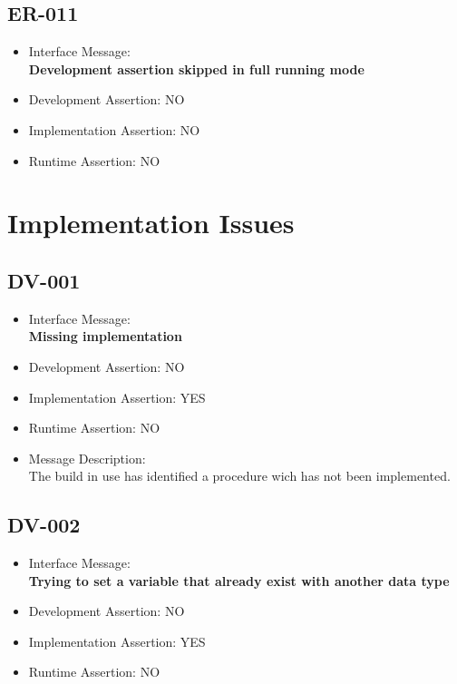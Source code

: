 \subsection{ER-011}
\begin{itemize}
  \item Interface Message:\\[1em]
    \textbf{Development assertion skipped in full running mode}
  \item Development Assertion: NO
  \item Implementation Assertion: NO
  \item Runtime Assertion: NO
\end{itemize}

\section{Implementation Issues}

\subsection{DV-001}
\begin{itemize}
  \item Interface Message:\\[1em]
    \textbf{Missing implementation}
  \item Development Assertion: NO
  \item Implementation Assertion: YES
  \item Runtime Assertion: NO
  \item Message Description:\\[1em]
    The build in use has identified a procedure wich has not been implemented.
\end{itemize}

\subsection{DV-002}
\begin{itemize}
  \item Interface Message:\\[1em]
    \textbf{Trying to set a variable that already exist with another data type}
  \item Development Assertion: NO
  \item Implementation Assertion: YES
  \item Runtime Assertion: NO
\end{itemize}

